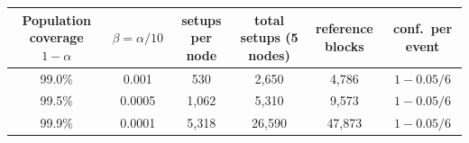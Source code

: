 \begin{tabular}{cccccc}
\toprule
Population coverage $1-\alpha$ & $\beta=\alpha/10$ & setups per node & total setups (5 nodes) & reference blocks & conf.\ per event \\
\midrule
99.0\% & 0.001 & 530 & 2,650 & 4,786 & $1-0.05/6$ \\
99.5\% & 0.0005 & 1,062 & 5,310 & 9,573 & $1-0.05/6$ \\
99.9\% & 0.0001 & 5,318 & 26,590 & 47,873 & $1-0.05/6$ \\
\bottomrule
\end{tabular}
